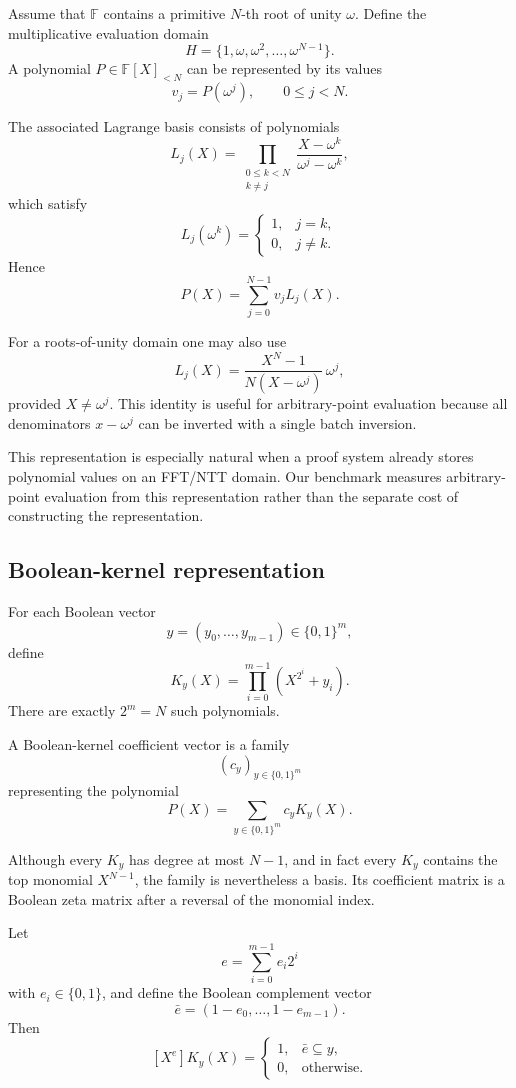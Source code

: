 Assume that \(\mathbb{F}\) contains a primitive \(N\)-th root of unity
\(\omega\).  Define the multiplicative evaluation domain
\[
H
=
\{1,\omega,\omega^2,\ldots,\omega^{N-1}\}.
\]
A polynomial \(P\in\mathbb{F}[X]_{<N}\) can be represented by its values
\[
v_j=P(\omega^j),
\qquad 0\le j<N.
\]

The associated Lagrange basis consists of polynomials
\[
L_j(X)
=
\prod_{\substack{0\le k<N\\k\ne j}}
\frac{X-\omega^k}{\omega^j-\omega^k},
\]
which satisfy
\[
L_j(\omega^k)=
\begin{cases}
1,&j=k,\\
0,&j\ne k.
\end{cases}
\]
Hence
\[
P(X)=\sum_{j=0}^{N-1}v_jL_j(X).
\]

For a roots-of-unity domain one may also use
\[
L_j(X)
=
\frac{X^N-1}{N(X-\omega^j)}\,\omega^j,
\]
provided \(X\ne\omega^j\).  This identity is useful for arbitrary-point
evaluation because all denominators \(x-\omega^j\) can be inverted with a
single batch inversion.

This representation is especially natural when a proof system already
stores polynomial values on an FFT/NTT domain.  Our benchmark measures
arbitrary-point evaluation from this representation rather than the
separate cost of constructing the representation.

\subsection{Boolean-kernel representation}

For each Boolean vector
\[
y=(y_0,\ldots,y_{m-1})\in\{0,1\}^m,
\]
define
\[
K_y(X)
=
\prod_{i=0}^{m-1}
\left(X^{2^i}+y_i\right).
\]
There are exactly \(2^m=N\) such polynomials.

A Boolean-kernel coefficient vector is a family
\[
(c_y)_{y\in\{0,1\}^m}
\]
representing the polynomial
\[
P(X)
=
\sum_{y\in\{0,1\}^m}
c_yK_y(X).
\]

Although every \(K_y\) has degree at most \(N-1\), and in fact every
\(K_y\) contains the top monomial \(X^{N-1}\), the family is nevertheless
a basis.  Its coefficient matrix is a Boolean zeta matrix after a reversal
of the monomial index.

\begin{lemma}
\label{lem:kernel-monomial-coeff}
Let
\[
e=\sum_{i=0}^{m-1}e_i2^i
\]
with \(e_i\in\{0,1\}\), and define the Boolean complement vector
\[
\bar e=(1-e_0,\ldots,1-e_{m-1}).
\]
Then
\[
[X^e]K_y(X)
=
\begin{cases}
1,&\bar e\subseteq y,\\
0,&\text{otherwise}.
\end{cases}
\]
\end{lemma}

